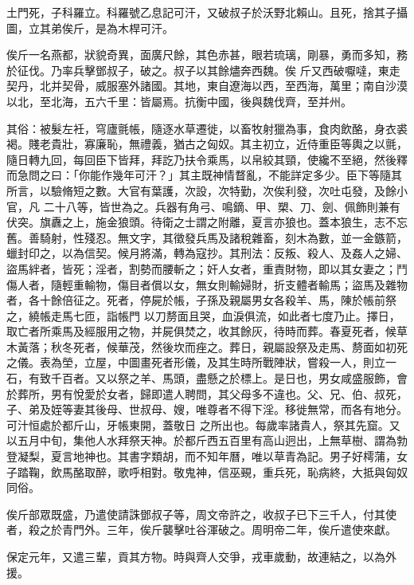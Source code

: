 \begin{pinyinscope}
 土門死，子科羅立。科羅號乙息記可汗，又破叔子於沃野北賴山。且死，捨其子攝圖，立其弟俟斤，是為木桿可汗。



 俟斤一名燕都，狀貌奇異，面廣尺餘，其色赤甚，眼若琉璃，剛暴，勇而多知，務於征伐。乃率兵擊鄧叔子，破之。叔子以其餘燼奔西魏。俟
 斤又西破嚈噠，東走契丹，北并契骨，威服塞外諸國。其地，東自遼海以西，至西海，萬里；南自沙漠以北，至北海，五六千里：皆屬焉。抗衡中國，後與魏伐齊，至并州。



 其俗：被髮左衽，穹廬氈帳，隨逐水草遷徙，以畜牧射獵為事，食肉飲酪，身衣裘褐。賤老貴壯，寡廉恥，無禮義，猶古之匈奴。其主初立，近侍重臣等輿之以氈，隨日轉九回，每回臣下皆拜，拜訖乃扶令乘馬，以帛絞其頸，使纔不至絕，然後釋而急問之曰：「你能作幾年可汗？」其主既神情瞀亂，不能詳定多少。臣下等隨其所言，以驗脩短之數。大官有葉護，次設，次特勤，次俟利發，次吐屯發，及餘小官，凡
 二十八等，皆世為之。兵器有角弓、鳴鏑、甲、槊、刀、劍、佩飾則兼有伏突。旗纛之上，施金狼頭。待衛之士謂之附離，夏言亦狼也。蓋本狼生，志不忘舊。善騎射，性殘忍。無文字，其徵發兵馬及諸稅雜畜，刻木為數，並一金鏃箭，蠟封印之，以為信契。候月將滿，轉為寇抄。其刑法：反叛、殺人、及姦人之婦、盜馬絆者，皆死；淫者，割勢而腰斬之；奸人女者，重責財物，即以其女妻之；鬥傷人者，隨輕重輸物，傷目者償以女，無女則輸婦財，折支體者輸馬；盜馬及雜物者，各十餘倍征之。死者，停屍於帳，子孫及親屬男女各殺羊、馬，陳於帳前祭之，繞帳走馬七匝，詣帳門
 以刀剺面且哭，血淚俱流，如此者七度乃止。擇日，取亡者所乘馬及經服用之物，并屍俱焚之，收其餘灰，待時而葬。春夏死者，候草木黃落；秋冬死者，候華茂，然後坎而痤之。葬日，親屬設祭及走馬、剺面如初死之儀。表為塋，立屋，中圖畫死者形儀，及其生時所戰陣狀，嘗殺一人，則立一石，有致千百者。又以祭之羊、馬頭，盡懸之於標上。是日也，男女咸盛服飾，會於葬所，男有悅愛於女者，歸即遣人聘問，其父母多不違也。父、兄、伯、叔死，子、弟及姪等妻其後母、世叔母、嫂，唯尊者不得下淫。移徙無常，而各有地分。可汁恒處於都斤山，牙帳東開，蓋敬日
 之所出也。每歲率諸貴人，祭其先窟。又以五月中旬，集他人水拜祭天神。於都斤西五百里有高山迥出，上無草樹、謂為勃登凝梨，夏言地神也。其書字類胡，而不知年曆，唯以草青為記。男子好樗蒲，女子踏鞠，飲馬酪取醉，歌呼相對。敬鬼神，信巫覡，重兵死，恥病終，大抵與匈奴同俗。



 俟斤部眾既盛，乃遣使請誅鄧叔子等，周文帝許之，收叔子已下三千人，付其使者，殺之於青門外。三年，俟斤襲擊吐谷渾破之。周明帝二年，俟斤遣使來獻。



 保定元年，又遣三輩，貢其方物。時與齊人交爭，戎車歲動，故連結之，以為外援。




\end{pinyinscope}
